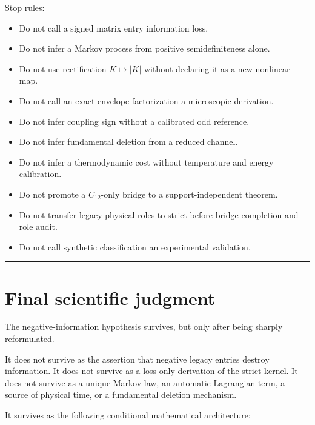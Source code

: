 \documentclass[11pt,a4paper,openany]{report}
\begin{document}
Stop rules:

\begin{itemize}
\item 
Do not call a signed matrix entry information loss.

\item 
Do not infer a Markov process from positive semidefiniteness alone.

\item 
Do not use rectification \(K\mapsto|K|\) without declaring it as a new nonlinear map.

\item 
Do not call an exact envelope factorization a microscopic derivation.

\item 
Do not infer coupling sign without a calibrated odd reference.

\item 
Do not infer fundamental deletion from a reduced channel.

\item 
Do not infer a thermodynamic cost without temperature and energy calibration.

\item 
Do not promote a \(C_{12}\)-only bridge to a support-independent theorem.

\item 
Do not transfer legacy physical roles to strict before bridge completion and role audit.

\item 
Do not call synthetic classification an experimental validation.

\end{itemize}

\par\medskip\hrule\medskip

\chapter{Final scientific judgment}

The negative-information hypothesis survives, but only after being sharply reformulated.

It does not survive as the assertion that negative legacy entries destroy information. It does not survive as a loss-only derivation of the strict kernel. It does not survive as a unique Markov law, an automatic Lagrangian term, a source of physical time, or a fundamental deletion mechanism.

It survives as the following conditional mathematical architecture:
\end{document}
